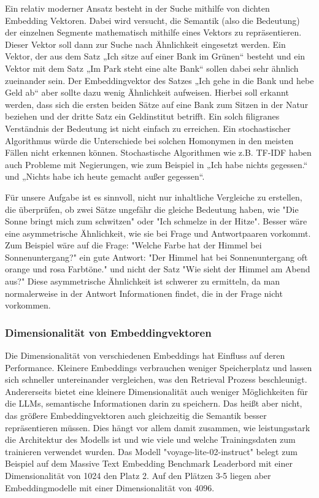 Ein relativ moderner Ansatz besteht in der Suche mithilfe von dichten Embedding Vektoren. 
Dabei wird versucht, die Semantik (also die Bedeutung) der einzelnen Segmente mathematisch mithilfe eines Vektors zu repräsentieren. 
Dieser Vektor soll dann zur Suche nach Ähnlichkeit eingesetzt werden. 
Ein Vektor, der aus dem Satz „Ich sitze auf einer Bank im Grünen“ besteht und ein Vektor mit dem Satz „Im Park steht eine alte Bank“ sollen dabei sehr ähnlich zueinander sein. 
Der Embeddingvektor des Satzes „Ich gehe in die Bank und hebe Geld ab“ aber sollte dazu wenig Ähnlichkeit aufweisen. 
Hierbei soll erkannt werden, dass sich die ersten beiden Sätze auf eine Bank zum Sitzen in der Natur beziehen und der dritte Satz ein Geldinstitut betrifft. 
Ein solch filigranes Verständnis der Bedeutung ist nicht einfach zu erreichen. 
Ein stochastischer Algorithmus würde die Unterschiede bei solchen Homonymen in den meisten Fällen nicht erkennen können. 
Stochastische Algorithmen wie z.B. TF-IDF haben auch Probleme mit Negierungen, wie zum Beispiel in „Ich habe nichts gegessen.“ und „Nichts habe ich heute gemacht außer gegessen“.

Für unsere Aufgabe ist es sinnvoll, nicht nur inhaltliche Vergleiche zu erstellen, die überprüfen, ob zwei Sätze ungefähr die gleiche Bedeutung haben, wie "Die Sonne bringt mich zum schwitzen" oder "Ich schmelze in der Hitze".
Besser wäre eine asymmetrische Ähnlichkeit, wie sie bei Frage und Antwortpaaren vorkommt.
Zum Beispiel wäre auf die Frage: "Welche Farbe hat der Himmel bei Sonnenuntergang?" ein gute Antwort: "Der Himmel hat bei Sonnenuntergang oft orange und rosa Farbtöne."  und nicht der Satz "Wie sieht der Himmel am Abend aus?"
Diese asymmetrische Ähnlichkeit ist schwerer zu ermitteln, da man normalerweise in der Antwort Informationen findet, die in der Frage nicht vorkommen.

\subsubsection{Dimensionalität von Embeddingvektoren}

Die Dimensionalität von verschiedenen Embeddings hat Einfluss auf deren Performance.
Kleinere Embeddings verbrauchen weniger Speicherplatz und lassen sich schneller untereinander vergleichen, was den Retrieval Prozess beschleunigt.
Andererseits bietet eine kleinere Dimensionalität auch weniger Möglichkeiten für die LLMs, semantische Informationen darin zu speichern.
Das heißt aber nicht, das größere Embeddingvektoren auch gleichzeitig die Semantik besser repräsentieren müssen.
Dies hängt vor allem damit zusammen, wie leistungsstark die Architektur des Modells ist und wie viele und welche Trainingsdaten zum trainieren verwendet wurden.
Das Modell "voyage-lite-02-instruct" belegt zum Beispiel auf dem Massive Text Embedding Benchmark Leaderbord mit einer Dimensionalität von 1024 den Platz 2.
Auf den Plätzen 3-5 liegen aber Embeddingmodelle mit einer Dimensionalität von 4096.


